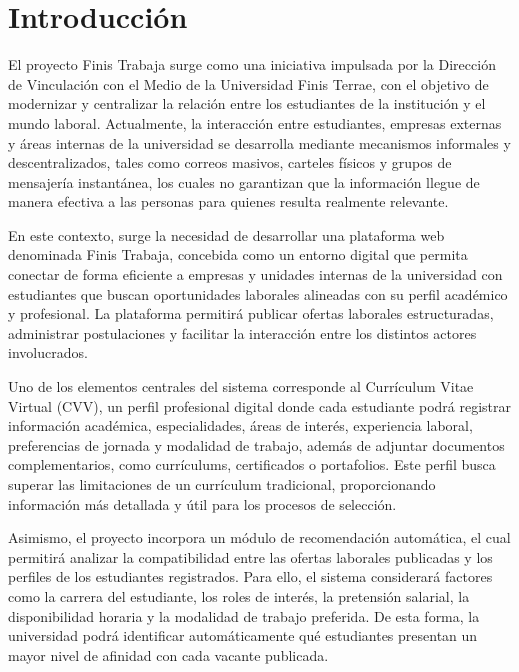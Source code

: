 \documentclass[11pt,a4paper]{Plantilla}
\begin{document}
\newpage

\listoffigures
\newpage

\section{Introducción}%

El proyecto Finis Trabaja surge como una iniciativa impulsada por la Dirección de Vinculación con el Medio de la Universidad Finis Terrae, con el objetivo de modernizar y centralizar la relación entre los estudiantes de la institución y el mundo laboral. Actualmente, la interacción entre estudiantes, empresas externas y áreas internas de la universidad se desarrolla mediante mecanismos informales y descentralizados, tales como correos masivos, carteles físicos y grupos de mensajería instantánea, los cuales no garantizan que la información llegue de manera efectiva a las personas para quienes resulta realmente relevante.

\vspace{0.5cm}

En este contexto, surge la necesidad de desarrollar una plataforma web denominada Finis Trabaja, concebida como un entorno digital que permita conectar de forma eficiente a empresas y unidades internas de la universidad con estudiantes que buscan oportunidades laborales alineadas con su perfil académico y profesional. La plataforma permitirá publicar ofertas laborales estructuradas, administrar postulaciones y facilitar la interacción entre los distintos actores involucrados.

\vspace{0.5cm}

Uno de los elementos centrales del sistema corresponde al Currículum Vitae Virtual (CVV), un perfil profesional digital donde cada estudiante podrá registrar información académica, especialidades, áreas de interés, experiencia laboral, preferencias de jornada y modalidad de trabajo, además de adjuntar documentos complementarios, como currículums, certificados o portafolios. Este perfil busca superar las limitaciones de un currículum tradicional, proporcionando información más detallada y útil para los procesos de selección.

\vspace{0.5cm}

Asimismo, el proyecto incorpora un módulo de recomendación automática, el cual permitirá analizar la compatibilidad entre las ofertas laborales publicadas y los perfiles de los estudiantes registrados. Para ello, el sistema considerará factores como la carrera del estudiante, los roles de interés, la pretensión salarial, la disponibilidad horaria y la modalidad de trabajo preferida. De esta forma, la universidad podrá identificar automáticamente qué estudiantes presentan un mayor nivel de afinidad con cada vacante publicada.
\end{document}
